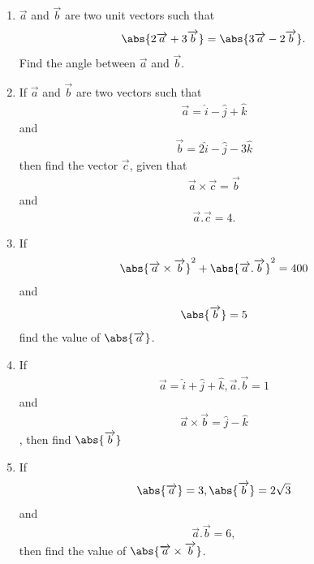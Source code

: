 \begin{enumerate}
\item $\overrightarrow{a}$   and  $\overrightarrow{ b}$ are two unit vectors such that \begin{align} \abs { 2\overrightarrow{ a}+3\overrightarrow{ b}} = \abs{3\overrightarrow{ a} - 2\overrightarrow{ b}}. \end{align} Find the angle between $\overrightarrow{ a }$ and $\overrightarrow{ b }$.
\item If $\overrightarrow{ a}$  and $\overrightarrow{b}$ are two vectors such that  \begin{align}\overrightarrow{a} = \hat{i} - \hat{j} + \hat{k} \end{align}and  \begin{align}\overrightarrow{b} = 2\hat{i} - \hat{j} - 3\hat{k}\end{align} then find the vector $\overrightarrow{c}$, given that \begin{align}\overrightarrow{a} \times \overrightarrow{c} = \overrightarrow{b}\end{align}  and \begin{align}\overrightarrow{a}.\overrightarrow{c}= 4.\end{align}
\item If \begin{align} \abs{\overrightarrow{ a } \times \overrightarrow { b }}^2 + \abs { \overrightarrow{ a } . \overrightarrow{ b }}^2= 400 \end{align} and  \begin{align}\abs { \overrightarrow{ b}} = 5 \end{align} find the value of  $\abs{\overrightarrow{ a }}$. 
\item If \begin{align}\overrightarrow{a} = \hat{i} + \hat{ j} + \hat{ k} , \overrightarrow{a} . \overrightarrow{b} = 1\end{align}  and \begin{align}\overrightarrow{a} \times \overrightarrow{b} = \hat{j} - \hat{k}\end{align},  then find  $\abs{\overrightarrow{b}}$ 
\item If \begin{align}\abs{\overrightarrow{ a}}= 3, \abs{\overrightarrow{ b}} = 2\sqrt{ 3}\end{align}  and \begin{align}\overrightarrow{ a} . \overrightarrow{ b} = 6,\end{align}then find the value of $\abs{\overrightarrow{ a} \times \overrightarrow{ b}}$.

\end{enumerate}
